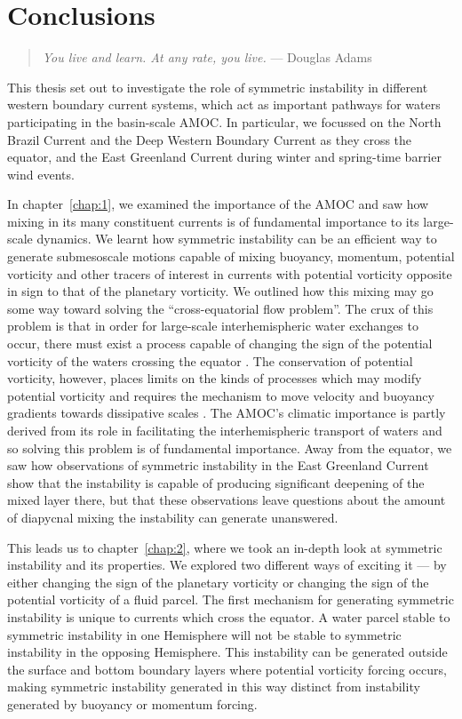\chapter{Conclusions}
\begin{quote}
    \textit{You live and learn. At any rate, you live.} --- Douglas Adams
\end{quote}
This thesis set out to investigate the role of symmetric instability in different western boundary current systems, which act as important pathways for waters participating in the basin-scale AMOC. In particular, we focussed on the North Brazil Current and the Deep Western Boundary Current as they cross the equator, and the East Greenland Current during winter and spring-time barrier wind events.

In chapter~\ref{chap:1}, we examined the importance of the AMOC and saw how mixing in its many constituent currents is of fundamental importance to its large-scale dynamics. We learnt how symmetric instability can be an efficient way to generate submesoscale motions capable of mixing buoyancy, momentum, potential vorticity and other tracers of interest in currents with potential vorticity opposite in sign to that of the planetary vorticity. We outlined how this mixing may go some way toward solving the ``cross-equatorial flow problem''. The crux of this problem is that in order for large-scale interhemispheric water exchanges to occur, there must exist a process capable of changing the sign of the potential vorticity of the waters crossing the equator \citep{Killworth1991, Nof1990, Csanady1985}. The conservation of potential vorticity, however, places limits on the kinds of processes which may modify potential vorticity and requires the mechanism to move velocity and buoyancy gradients towards dissipative scales \citep{Haynes1987}. The AMOC's climatic importance is partly derived from its role in facilitating the interhemispheric transport of waters and so solving this problem is of fundamental importance. Away from the equator, we saw how observations of symmetric instability in the East Greenland Current show that the instability is capable of producing significant deepening of the mixed layer there, but that these observations leave questions about the amount of diapycnal mixing the instability can generate unanswered.

This leads us to chapter~\ref{chap:2}, where we took an in-depth look at symmetric instability and its properties. We explored two different ways of exciting it --- by either changing the sign of the planetary vorticity or changing the sign of the potential vorticity of a fluid parcel. The first mechanism for generating symmetric instability is unique to currents which cross the equator. A water parcel stable to symmetric instability in one Hemisphere will not be stable to symmetric instability in the opposing Hemisphere. This instability can be generated outside the surface and bottom boundary layers where potential vorticity forcing occurs, making symmetric instability generated in this way distinct from instability generated by buoyancy or momentum forcing.

